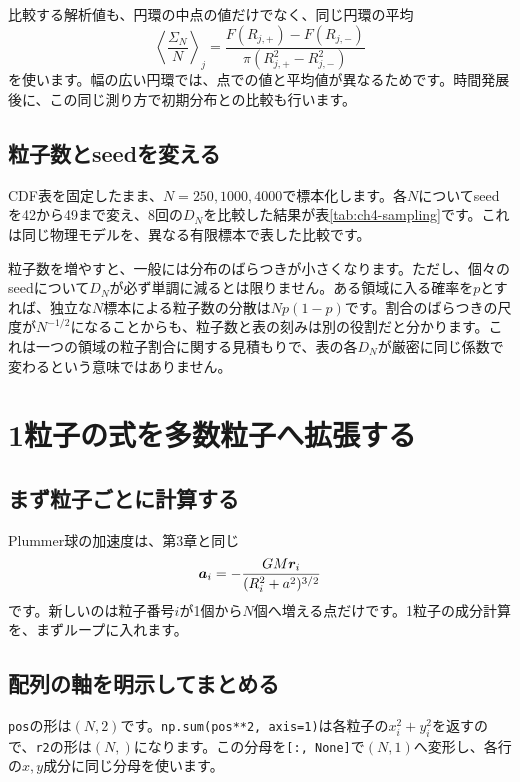 比較する解析値も、円環の中点の値だけでなく、同じ円環の平均
\begin{equation}
\left\langle\frac{\Sigma_N}{N}\right\rangle_j
=\frac{F(R_{j,+})-F(R_{j,-})}{\pi(R_{j,+}^2-R_{j,-}^2)}
\label{eq:ch4-surface-exact-bin}
\end{equation}
を使います。幅の広い円環では、点での値と平均値が異なるためです。時間発展後に、この同じ測り方で初期分布との比較も行います。

\subsection{粒子数とseedを変える}
CDF表を固定したまま、$N=250,1000,4000$で標本化します。各$N$についてseedを42から49まで変え、8回の$D_N$を比較した結果が表\ref{tab:ch4-sampling}です。これは同じ物理モデルを、異なる有限標本で表した比較です。
\begin{table}[htbp]
\centering\small
\caption{粒子数とseedによる経験CDFのずれ。平均・最小・最大は8個のseedでの値です。数値積分法の収束次数を測った表ではありません。}
\label{tab:ch4-sampling}

\end{table}

粒子数を増やすと、一般には分布のばらつきが小さくなります。ただし、個々のseedについて$D_N$が必ず単調に減るとは限りません。ある領域に入る確率を$p$とすれば、独立な$N$標本による粒子数の分散は$Np(1-p)$です。割合のばらつきの尺度が$N^{-1/2}$になることからも、粒子数と表の刻みは別の役割だと分かります。これは一つの領域の粒子割合に関する見積もりで、表の各$D_N$が厳密に同じ係数で変わるという意味ではありません。

\section{1粒子の式を多数粒子へ拡張する}
\label{sec:ch4-vectorization}
\subsection{まず粒子ごとに計算する}
Plummer球の加速度は、第3章と同じ
\begin{equation}
\boldsymbol a_i=-\frac{GM\boldsymbol r_i}{(R_i^2+a^2)^{3/2}}
\label{eq:ch4-acceleration}
\end{equation}
です。新しいのは粒子番号$i$が1個から$N$個へ増える点だけです。1粒子の成分計算を、まずループに入れます。

\subsection{配列の軸を明示してまとめる}
\texttt{pos}の形は$(N,2)$です。\texttt{np.sum(pos**2, axis=1)}は各粒子の$x_i^2+y_i^2$を返すので、\texttt{r2}の形は$(N,)$になります。この分母を\texttt{[:, None]}で$(N,1)$へ変形し、各行の$x,y$成分に同じ分母を使います。

